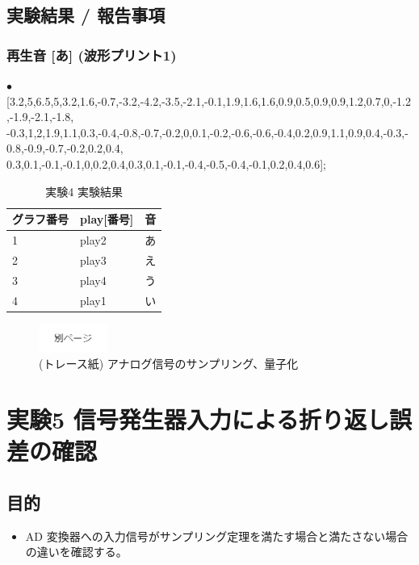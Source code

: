 \documentclass[10pt]{article}
\begin{document}
\subsection{実験結果 / 報告事項}
\subsubsection{再生音 [あ] (波形プリント1)}
$\bullet$ [3.2,5,6.5,5,3.2,1.6,-0.7,-3.2,-4.2,-3.5,-2.1,-0.1,1.9,1.6,1.6,0.9,0.5,0.9,0.9,1.2,0.7,0,-1.2,-1.9,-2.1,-1.8,\\ -0.3,1,2,1.9,1.1,0.3,-0.4,-0.8,-0.7,-0.2,0,0.1,-0.2,-0.6,-0.6,-0.4,0.2,0.9,1.1,0.9,0.4,-0.3,-0.8,-0.9,-0.7,-0.2,0.2,0.4,\\
0.3,0.1,-0.1,-0.1,0,0.2,0.4,0.3,0.1,-0.1,-0.4,-0.5,-0.4,-0.1,0.2,0.4,0.6];

\begingroup
\setlength{\tabcolsep}{5pt} %
\renewcommand{\arraystretch}{1.5} %
\begin{table}[H]
    \centering
	\caption{実験4 実験結果}
	\begin{tabular}{|l|l|l|}
	    \hline
	      グラフ番号 & play[番号] & 音 \\[0.5ex]
		\hline\hline
		 1 & play2 & あ  \\ \hline
		 2 & play3 & え  \\ \hline
		 3 & play4 & う  \\ \hline
		 4 & play1 & い  \\ \hline
    \end{tabular}
\end{table} 
\endgroup

\begin{figure}[H]
		\centering
		\includegraphics[width=0.2\textwidth]{page.png}
		\caption{(トレース紙) アナログ信号のサンプリング、量子化}
\end{figure}
\pagebreak

\section{実験5  信号発生器入力による折り返し誤差の確認 }

\subsection{目的}
\begin{itemize}
    \item AD 変換器への入力信号がサンプリング定理を満たす場合と満たさない場合の違いを確認する。
\end{itemize}
\end{document}
